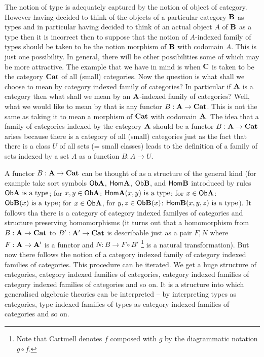 The notion of type is adequately captured by the notion of object of category.
%
However having decided to think of the objects of a particular category $\mathbf{B}$ as types and in particular having decided to think of an actual object $A$ of $\mathbf{B}$ as a type then it is incorrect then to suppose that the notion of $A$-indexed family of types should be taken to be the notion morphism of $\mathbf{B}$ with codomain $A$.
%
This is just one possibility. In general, there will be other possibilities some of which may be more attractive.
%
The example that we have in mind is when $\mathbf{C}$ is taken to be the category $\mathbf{Cat}$ of all (small) categories.
%
Now the question is what shall we choose to mean by category indexed family of categories? In particular if $\mathbf{A}$ is a category then what shall we mean by an $\mathbf{A}$-indexed family of categories?
%
Well, what we would like to mean by that is any functor $B:\mathbf{A}\to\mathbf{Cat}$. This is not the same as taking it to mean a morphism of $\mathbf{Cat}$ with codomain $\mathbf{A}$.
%
The idea that a family of categories indexed by the category $\mathbf{A}$ should be a functor $B:\mathbf{A}\to\mathbf{Cat}$ arises because there is a category of all (small) categories just as the fact that there is a class $U$ of all sets (= small classes) leads to the definition of a family of sets indexed by a set $A$ as a function $B:A\to U$.

A functor $B:\mathbf{A}\to\mathbf{Cat}$ can be thought of as a structure of the general kind (for example take sort symbols $\mathsf{Ob}\mathbf{A}$, $\mathsf{Hom}\mathbf{A}$, $\mathsf{Ob}\mathbf{B}$, and $\mathsf{Hom}\mathbf{B}$ introduced by rules $\mathsf{Ob}\mathbf{A}\text{ is a type}$; for $x,y\in \mathsf{Ob}\mathbf{A}$: $\mathsf{Hom}\mathbf{A}(x,y)\text{ is a type}$; for $x\in \mathsf{Ob}\mathbf{A}$: $\mathsf{Ob}\mathbf{B}(x)\text{ is a type}$; for $x\in\mathsf{Ob}\mathbf{A}$, for $y,z\in\mathsf{Ob}\mathbf{B}(x)$: $\mathsf{Hom}\mathbf{B}(x,y,z)\text{ is a type}$).
%
It follows tha there is a category of category indexed familyes of categories and structure preserving homomorphisms (it turns out that a homomorphism from $B:\mathbf{A}\to\mathbf{Cat}$ to $B':\mathbf{A}'\to\mathbf{Cat}$ is describable just as a pair $F,N$ where $F:\mathbf{A}\to\mathbf{A}'$ is a functor and $N:B\to F\circ B'$ \footnote{Note that Cartmell denotes $f$ composed with $g$ by the diagrammatic notation $g\circ f$.} is a natural transformation).
%
But now there follows the notion of a category indexed family of category indexed families of categories.
%
This procedure can be iterated.
%
We get a huge structure of categories, category indexed families of categories, category indexed families of category indexed families of categories and so on.
%
It is a structure into which generalised algebraic theories can be interpreted -- by interpreting types as categories, type indexed families of types as category indexed families of categories and so on.

